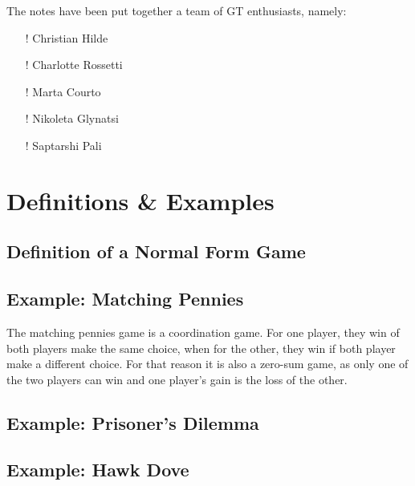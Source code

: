 \documentclass{article}
\begin{document}
The notes have been put together a team of GT enthusiasts, namely:

\begin{itemize}
    \item [!] Christian Hilde
    \item [!] Charlotte Rossetti
    \item [!] Marta Courto
    \item [!] Nikoleta Glynatsi
    \item [!] Saptarshi Pali
\end{itemize}

\section{Definitions \& Examples}

\subsection{Definition of a Normal Form Game}





\subsection{Example: Matching Pennies}

The matching pennies game is a coordination game.
For one player, they win of both players make the same choice, when for the other, they win if both player make a different choice. 
For that reason it is also a zero-sum game, as only one of the two players can win and one player's gain is the loss of the other. 


\subsection{Example: Prisoner's Dilemma}





\subsection{Example: Hawk Dove}
\end{document}
